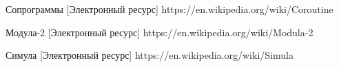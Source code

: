 \begingroup 
\renewcommand{\section}[2]{\anonsection{Библиографический список}}
\begin{thebibliography}{00}

    Сопрограммы
    [Электронный ресурс] 
    https://en.wikipedia.org/wiki/Coroutine

	Модула-2
	[Электронный ресурс] 
	https://en.wikipedia.org/wiki/Modula-2
	
	Симула
	[Электронный ресурс]
	https://en.wikipedia.org/wiki/Simula
	
\end{thebibliography}
\endgroup

\clearpage
